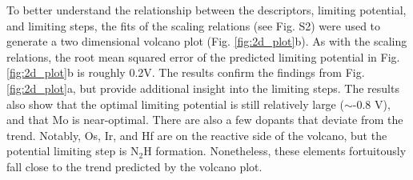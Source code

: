 To better understand the relationship between the descriptors, limiting potential, and limiting steps, the fits of the scaling relations (see Fig. S2) were used to generate a two dimensional volcano plot (Fig. \ref{fig:2d_plot}b). As with the scaling relations, the root mean squared error of the predicted limiting potential in Fig. \ref{fig:2d_plot}b is roughly 0.2V. The results confirm the findings from Fig. \ref{fig:2d_plot}a, but provide additional insight into the limiting steps. 
The results also show that the optimal limiting potential is still relatively large ($\sim$-0.8 V), and that Mo is near-optimal.
There are also a few dopants that deviate from the trend. 
Notably, Os, Ir, and Hf are on the reactive side of the volcano, but the potential limiting step is N$_2$H formation\cite{Comer_2018, Hoskuldsson_2017}. Nonetheless, these elements fortuitously fall close to the trend predicted by the volcano plot. 


